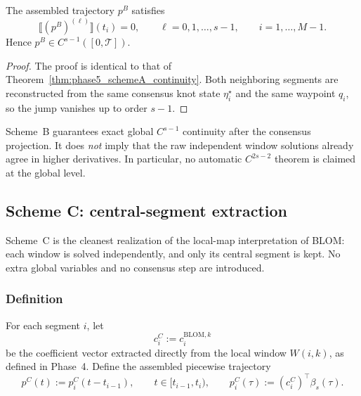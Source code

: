 \begin{theorem}
\label{thm:phase5_schemeB_continuity}
The assembled trajectory \(p^B\) satisfies
\[
\llbracket (p^B)^{(\ell)} \rrbracket(t_i)=0,
\qquad
\ell=0,1,\dots,s-1,
\qquad
i=1,\dots,M-1.
\]
Hence \(p^B\in C^{s-1}([0,\mathcal T])\).
\end{theorem}

\begin{proof}
The proof is identical to that of Theorem~\ref{thm:phase5_schemeA_continuity}.
Both neighboring segments are reconstructed from the same consensus knot state \(\eta_i^\star\) and the same waypoint \(q_i\), so the jump vanishes up to order \(s-1\).
\end{proof}

\begin{remark}
\label{rem:phase5_schemeB_scope}
Scheme~B guarantees exact global \(C^{s-1}\) continuity after the consensus projection.
It does \emph{not} imply that the raw independent window solutions already agree in higher derivatives.
In particular, no automatic \(C^{2s-2}\) theorem is claimed at the global level.
\end{remark}

\subsection{Scheme C: central-segment extraction}
\label{subsec:phase5_schemeC}

Scheme~C is the cleanest realization of the local-map interpretation of BLOM:
each window is solved independently, and only its central segment is kept.
No extra global variables and no consensus step are introduced.

\subsubsection{Definition}
\label{subsubsec:phase5_schemeC_definition}

For each segment \(i\), let
\[
c_i^{C}:=c_i^{\mathrm{BLOM},k}
\]
be the coefficient vector extracted directly from the local window \(W(i,k)\), as defined in Phase~4.
Define the assembled piecewise trajectory
\begin{equation}
\label{eq:phase5_schemeC_trajectory}
p^C(t):=p_i^C(t-t_{i-1}),
\qquad
t\in[t_{i-1},t_i),
\qquad
p_i^C(\tau):=(c_i^C)^\top\beta_s(\tau).
\end{equation}

